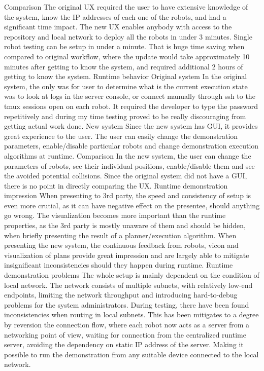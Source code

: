 \secc Comparison
The original UX required the user to have extensive knowledge of the system, know the IP addresses of each one of the robots, and had a significant time impact. The new UX enables anybody with access to the repository and local network to deploy all the robots in under 3 minutes. Single robot testing can be setup in under a minute. That is huge time saving when compared to original workflow, where the update would take approximately 10 minutes after getting to know the system, and required additional 2 hours of getting to know the system.
\sec Runtime behavior
\secc Original system
In the original system, the only was for user to determine what is the current execution state was to look at logs in the server console, or connect manually through ssh to the tmux sessions open on each robot. It required the developer to type the password repetitively and during my time testing proved to be really discouraging from getting actual work done.
\secc New system
Since the new system has GUI, it provides great experience to the user. The user can easily change the demonstration parameters, enable/disable particular robots and change demonstration execution algorithms at runtime.
\secc Comparison
In the new system, the user can change the parameters of robots, see their individual positions, enable/disable them and see the avoided potential collisions. Since the original system did not have a GUI, there is no point in directly comparing the UX. 
\sec Runtime demonstration impression
When presenting to 3rd party, the speed and consistency of setup is even more crutial, as it can have negative effect on the presentee, should anything go wrong. The visualization becomes more important than the runtime properties, as the 3rd party is mostly unaware of them and should be hidden, when briefly presenting the result of a planner/execution algorithm. When presenting the new system, the continuous feedback from robots, vicon and visualization of plans provide great impression and are largely able to mitigate insignificant inconsistencies should they happen during runtime.
\sec Runtime demonstration problems
The whole setup is mainly dependent on the condition of local network. The network consists of multiple subnets, with relatively low-end endpoints, limiting the network throughput and introducing hard-to-debug problems for the system administrators. During testing, there have been found inconsistencies when routing in local subnets. This has been mitigates to a degree by reversion the connection flow, where each robot now acts as a server from a networking point of view, waiting for connection from the centralized runtime server, avoiding the dependency on static IP address of the server. Making it possible to run the demonstration from any suitable device connected to the local network.